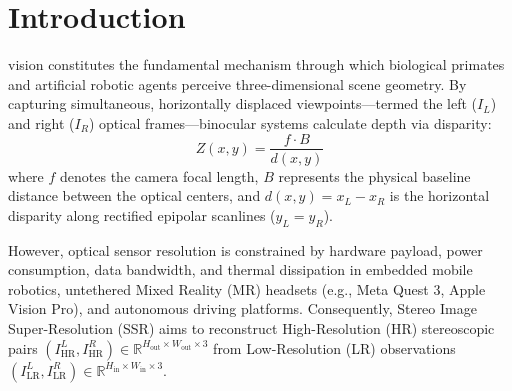 \documentclass[10pt,journal,compsoc]{IEEEtran}
\begin{document}
\maketitle
\IEEEdisplaynontitleabstractindextext
\IEEEpeerreviewmaketitle

\section{Introduction}
 vision constitutes the fundamental mechanism through which biological primates and artificial robotic agents perceive three-dimensional scene geometry. By capturing simultaneous, horizontally displaced viewpoints---termed the left ($I_L$) and right ($I_R$) optical frames---binocular systems calculate depth via disparity:
\begin{equation}
Z(x, y) = \frac{f \cdot B}{d(x, y)}
\label{eq:stereo_depth}
\end{equation}
where $f$ denotes the camera focal length, $B$ represents the physical baseline distance between the optical centers, and $d(x, y) = x_L - x_R$ is the horizontal disparity along rectified epipolar scanlines ($y_L = y_R$). 

However, optical sensor resolution is constrained by hardware payload, power consumption, data bandwidth, and thermal dissipation in embedded mobile robotics, untethered Mixed Reality (MR) headsets (e.g., Meta Quest 3, Apple Vision Pro), and autonomous driving platforms. Consequently, Stereo Image Super-Resolution (SSR) aims to reconstruct High-Resolution (HR) stereoscopic pairs $(I_{\text{HR}}^L, I_{\text{HR}}^R) \in \mathbb{R}^{H_{\text{out}} \times W_{\text{out}} \times 3}$ from Low-Resolution (LR) observations $(I_{\text{LR}}^L, I_{\text{LR}}^R) \in \mathbb{R}^{H_{\text{in}} \times W_{\text{in}} \times 3}$.
\end{document}
